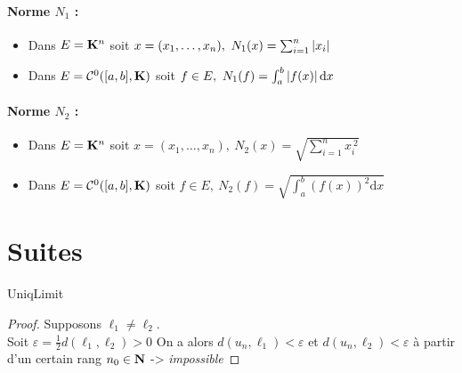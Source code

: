 		\paragraph{Norme $N_1$ :} 
		\begin{itemize}
			\item Dans $E={\mathbf{K}}^n$ soit $x=(x_1,\dots ,x_n) ,~ N_1(x) = \sum_{i=1}^n \left\vert x_i \right\vert $
			\item Dans $E={\mathcal{C}}^0([a,b],{\mathbf{K}})$ soit $f\in E,~N_1 (f) = \int_a^b \left\vert f(x) \right\vert \mathrm{d}x$
		\end{itemize}
		
		\paragraph{Norme $N_2$ :} 
		\begin{itemize}
			\item Dans $E={\mathbf{K}}^n$ soit $x=(x_1,\dots ,x_n) ,~ N_2(x) = \sqrt{\sum_{i=1}^n x_i^{~2}} $
			\item Dans $E={\mathcal{C}}^0([a,b],{\mathbf{K}})$ soit $f\in E,~N_2 (f) = \sqrt{\int_a^b \left( f(x)\right)^2 \mathrm{d}x}$
		\end{itemize} \medskip


\section{Suites}
		
		
		{UniqLimit}
		
		\begin{proof}
		Supposons $\ell_1\neq \ell_2$.\\
		Soit $\varepsilon = \frac{1}{2} d(\ell_1,\ell_2) >0$
		On a alors $d(u_n, \ell_1) < \varepsilon$ et $d(u_n, \ell_2) < \varepsilon$ à partir d'un certain rang $n_0 \in {\mathbf{N}}$ ->  \emph{impossible}
		\end{proof} \medskip
		
